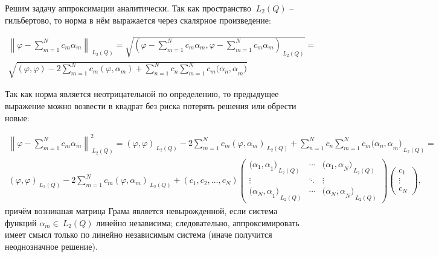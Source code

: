 ﻿\documentclass[a4paper, 12pt]{article}
\begin{document}
Решим задачу аппроксимации аналитически. Так как пространство ${\ L}_2\left(Q\right)$ -- гильбертово, то норма в нём выражается через скалярное произведение:

\begin{multline}{\left\|\varphi -\sum^N_{m=1}{c_m}{\alpha }_m\right\|}_{{\ L}_2\left(Q\right)}=\sqrt{{\left(\varphi -\sum^N_{m=1}{c_m}{\alpha }_m,\varphi -\sum^N_{m=1}{c_m}{\alpha }_m\right)}_{{\ L}_2\left(Q\right)}}=\\ 
\sqrt{\left(\varphi ,\varphi \right)-2\sum^N_{m=1}{c_m}\left(\varphi ,{\alpha }_m\right)+\sum^N_{n=1}{c_n}\sum^N_{m=1}{c_m}{({\alpha }_n,\alpha }_m)}\end{multline} 

Так как норма является неотрицательной по определению, то предыдущее выражение можно возвести в квадрат без риска потерять решения или обрести новые:

\begin{multline}{\left\|\varphi -\sum^N_{m=1}{c_m}{\alpha }_m\right\|}^2_{{\ L}_2\left(Q\right)}={\left(\varphi ,\varphi \right)}_{{\ L}_2\left(Q\right)}-2\sum^N_{m=1}{c_m}{\left(\varphi ,{\alpha }_m\right)}_{{\ L}_2\left(Q\right)}+\sum^N_{n=1}{c_n}\sum^N_{m=1}{c_m}{{({\alpha }_n,\alpha }_m)}_{{\ L}_2\left(Q\right)}=\\
    {\left(\varphi ,\varphi \right)}_{{\ L}_2\left(Q\right)}-2\sum^N_{m=1}{c_m}{\left(\varphi ,{\alpha }_m\right)}_{{\ L}_2\left(Q\right)}+\left(c_1,c_2,\dots ,c_N\right)\left( \begin{array}{ccc}
{{({\alpha }_1,\alpha }_1)}_{{\ L}_2\left(Q\right)} & \cdots  & {{({\alpha }_1,\alpha }_N)}_{{\ L}_2\left(Q\right)} \\ 
\vdots  & \ddots  & \vdots  \\ 
{{({\alpha }_N,\alpha }_1)}_{{\ L}_2\left(Q\right)} & \cdots  & {{({\alpha }_N,\alpha }_N)}_{{\ L}_2\left(Q\right)} \end{array}
\right)\left( \begin{array}{c}
c_1 \\ 
\vdots  \\ 
c_N \end{array}
\right),\end{multline} 
причём возникшая матрица Грама является невырожденной, если система функций ${\alpha }_m\in {\ L}_2\left(Q\right)$ линейно независима; следовательно, аппроксимировать имеет смысл только по линейно независимым система (иначе получится неоднозначное решение).
\end{document}
